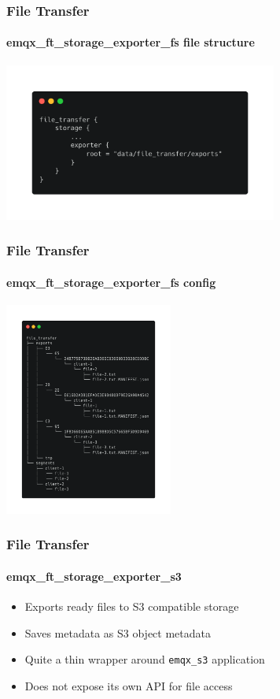 \documentclass{beamer}
\begin{document}
\begin{frame}
    \frametitle{File Transfer}
    \framesubtitle{emqx\_ft\_storage\_exporter\_fs file structure}

    \begin{center}
        \includegraphics[width=9cm, keepaspectratio]{images/ft_storage_fs_exports_fs_conf.png}
    \end{center}
\end{frame}

\begin{frame}
    \frametitle{File Transfer}
    \framesubtitle{emqx\_ft\_storage\_exporter\_fs config}

    \begin{center}
        \includegraphics[height=7cm, keepaspectratio]{images/ft_storage_fs_exports_fs_tree.png}
    \end{center}
\end{frame}


\begin{frame}
    \frametitle{File Transfer}
    \framesubtitle{emqx\_ft\_storage\_exporter\_s3}
    \begin{itemize}
        \item Exports ready files to S3 compatible storage
        \item Saves metadata as S3 object metadata
        \item Quite a thin wrapper around \lstinline{emqx_s3} application
        \item Does not expose its own API for file access
    \end{itemize}
    \begin{center}
    \end{center}
\end{frame}
\end{document}
